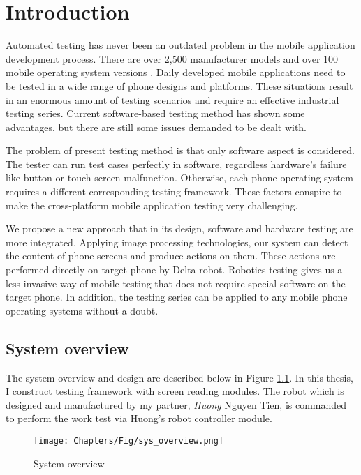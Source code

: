 \chapter{Introduction}

Automated testing has never been an outdated problem in the mobile application development process. There are over 2,500 manufacturer models and over 100 mobile operating system versions \cite{crittercism}. Daily developed mobile applications need to be tested in a wide range of phone designs and platforms. These situations result in an enormous amount of testing scenarios and require an effective industrial testing series. Current software-based testing method has shown some advantages, but there are still some issues demanded to be dealt with.

The problem of present testing method is that only software aspect is considered. The tester can run test cases perfectly in software, regardless hardware's failure like button or touch screen malfunction. Otherwise, each phone operating system requires a different corresponding testing framework. These factors conspire to make the cross-platform mobile application testing very challenging. \nocite{weinman_thesis}

We propose a new approach that in its design, software and hardware testing are more integrated. Applying image processing technologies, our system can detect the content of phone screens and produce actions on them. These actions are performed directly on target phone by Delta robot. Robotics testing gives us a less invasive way of mobile testing that does not require special software on the target phone. In addition, the testing series can be applied to any mobile phone operating systems without a doubt.

\section{System overview}
The system overview and design are described below in Figure \ref{fig:sys_overview}.
In this thesis, I construct testing framework with screen reading modules. The robot which is designed and manufactured by my partner, \textit{Huong} Nguyen Tien, is commanded to perform the work test via Huong's robot controller module.

	\begin{figure}
		\centering
		\texttt{[image: Chapters/Fig/sys\_overview.png]}
		\caption{System overview}
		\label{fig:sys_overview}
	\end{figure}

